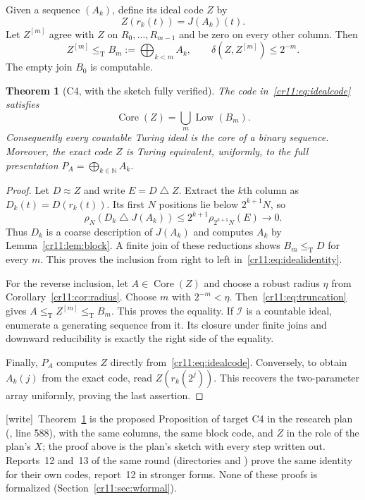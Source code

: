 \documentclass[11pt,letterpaper]{article}
\theoremstyle{plain}
\newtheorem{theorem}{Theorem}[section]
\theoremstyle{definition}
\theoremstyle{remark}
\numberwithin{equation}{section}
\newcommand{\N}{\mathbb N}
\newcommand{\leT}{\leq_{\mathrm T}}
\newcommand{\Core}{\operatorname{Core}}
\newcommand{\Low}{\operatorname{Low}}
\newcommand{\bitsum}{\mathbin{\triangle}}
\newcommand{\I}{\mathcal I}
\newcommand{\wtag}{\textup{[write]}}
\begin{document}
Given a sequence $(A_k)$, define its ideal code $Z$ by
\begin{equation}\label{cr11:eq:idealcode}
                         Z(r_k(t))=J(A_k)(t).
\end{equation}
Let $Z^{[m]}$ agree with $Z$ on $R_0,\ldots,R_{m-1}$ and be zero on every
other column. Then
\begin{equation}\label{cr11:eq:truncation}
 Z^{[m]}\leT B_m:=\bigoplus_{k<m}A_k,
 \qquad \delta(Z,Z^{[m]})\leq2^{-m}.
\end{equation}
The empty join $B_0$ is computable.

\begin{theorem}[C4, with the sketch fully verified]\label{cr11:thm:ideal}
The code in~\eqref{cr11:eq:idealcode} satisfies
\begin{equation}\label{cr11:eq:idealidentity}
                    \Core(Z)=\bigcup_m\Low(B_m).
\end{equation}
Consequently every countable Turing ideal is the core of a binary sequence.
Moreover, the exact code $Z$ is Turing equivalent, uniformly, to the full
presentation $P_A=\bigoplus_{k\in\N}A_k$.
\end{theorem}
\begin{proof}
Let $D\approx Z$ and write $E=D\bitsum Z$. Extract the $k$th column as
$D_k(t)=D(r_k(t))$. Its first $N$ positions lie below $2^{k+1}N$, so
\[
 \rho_N(D_k\bitsum J(A_k))
       \leq2^{k+1}\rho_{2^{k+1}N}(E)\longrightarrow0.
\]
Thus $D_k$ is a coarse description of $J(A_k)$ and computes $A_k$ by
Lemma~\ref{cr11:lem:block}. A finite join of these reductions shows
$B_m\leT D$ for every $m$. This proves the inclusion from right to left
in~\eqref{cr11:eq:idealidentity}.

For the reverse inclusion, let $A\in\Core(Z)$ and choose a robust radius
$\eta$ from Corollary~\ref{cr11:cor:radius}. Choose $m$ with $2^{-m}<\eta$.
Then~\eqref{cr11:eq:truncation} gives
$A\leT Z^{[m]}\leT B_m$. This proves the equality. If $\I$ is a countable
ideal, enumerate a generating sequence from it. Its closure under finite
joins and downward reducibility is exactly the right side of the equality.

Finally, $P_A$ computes $Z$ directly from~\eqref{cr11:eq:idealcode}. Conversely,
to obtain $A_k(j)$ from the exact code, read
$Z(r_k(2^j))$. This recovers the two-parameter array uniformly, proving the
last assertion.
\end{proof}

\noindent\wtag\ Theorem~\ref{cr11:thm:ideal} is the proposed Proposition of
target C4 in the research plan (, line
588), with the same columns, the same block code, and $Z$ in the role of
the plan's $X$; the proof above is the plan's sketch with every step
written out. Reports~12 and~13 of the same round (directories 
and ) prove the same identity for their own codes, report~12
in stronger forms. None of these proofs is formalized
(Section~\ref{cr11:sec:wformal}).
\end{document}

